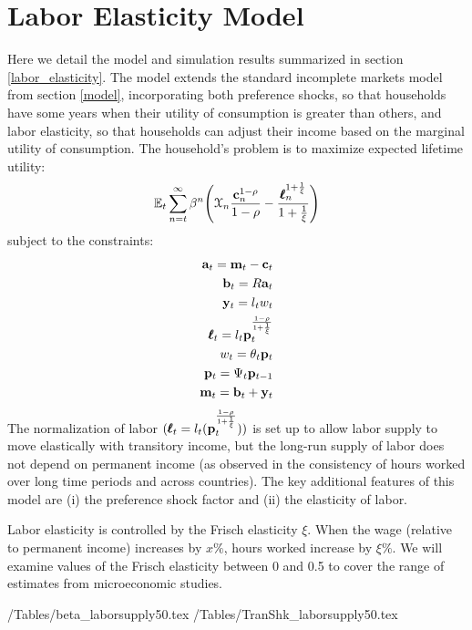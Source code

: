 \documentclass[titlepage]{\econtex}\newcommand{\texname}{ConsumptionHeterogeneity}
\begin{document}
\section{Labor Elasticity Model} \label{labor_elasticity_model}
\setcounter{figure}{0}   
\setcounter{table}{0} 
Here we detail the model and simulation results summarized in section \ref{labor_elasticity}. The model extends the standard incomplete markets model from section \ref{model}, incorporating both preference shocks, so that households have some years when their utility of consumption is greater than others, and labor elasticity, so that households can adjust their income based on the marginal utility of consumption. The household's problem is to maximize expected lifetime utility:
\begin{align*}
\mathbb{E}_t \sum_{n=t}^{\infty} \beta^n \Bigg(\mathcal{X}_n \frac{ \mathbf{c}_n^{1-\rho}}{1-\rho}-\frac{\pmb{\ell}_n^{1+\frac{1}{\xi}}}{1+\frac{1}{\xi}} \Bigg)
\end{align*}
subject to the constraints:
\begin{align*}
\mathbf{a}_t = \mathbf{m}_t - \mathbf{c}_t \\
\mathbf{b}_t = R\mathbf{a}_t \\
\mathbf{y}_t =  l_t w_t \\
\pmb{\ell}_t = l_t \mathbf{p}_t^{\frac{1-\rho}{1+\frac{1}{\xi}}}\\
w_t = \theta_t \mathbf{p}_t \\
\mathbf{p}_t = \Psi_t \mathbf{p}_{t-1} \\
\mathbf{m}_t = \mathbf{b}_t + \mathbf{y}_t
\end{align*}
The normalization of labor $(\pmb{\ell}_t = l_t (\mathbf{p}_t^{\frac{1-\rho}{1+\frac{1}{\xi}}}))$ is set up to allow labor supply to move elastically with transitory income, but the long-run supply of labor does not depend on permanent income (as observed in the consistency of hours worked over long time periods and across countries). The key additional features of this model are (i) the preference shock factor and (ii) the elasticity of labor.

Labor elasticity is controlled by the Frisch elasticity $\xi$. When the wage (relative to permanent income) increases by $x\%$, hours worked increase by $\xi\%$. We will examine values of the Frisch elasticity between 0 and 0.5 to cover the range of estimates from microeconomic studies.

\begin{center}
	\econtexRoot/Tables/beta_laborsupply50.tex	
	\econtexRoot/Tables/TranShk_laborsupply50.tex		
	\label{table:fitted_beta_and_transtd}
\end{center}
\end{document}
